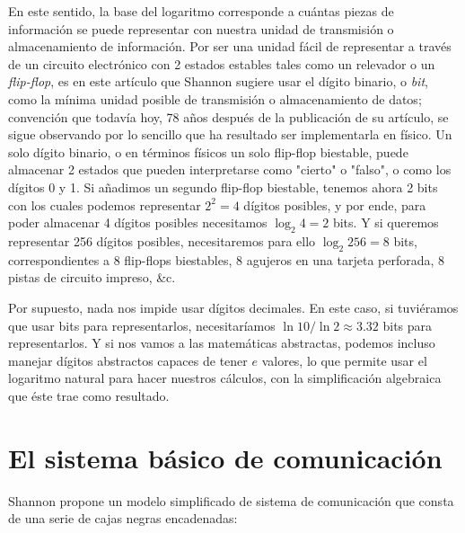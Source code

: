 \documentclass[spanish]{article}
\begin{document}
En este sentido, la base del logaritmo corresponde a cuántas piezas de información se puede representar con nuestra unidad de transmisión o almacenamiento de información. Por ser una unidad fácil de representar a través de un circuito electrónico con 2 estados estables tales como un relevador o un \textit{flip-flop}, es en este artículo que Shannon sugiere usar el dígito binario, o \textit{bit}, como la mínima unidad posible de transmisión o almacenamiento de datos; convención que todavía hoy, 78 años después de la publicación de su artículo, se sigue observando por lo sencillo que ha resultado ser implementarla en físico. Un solo dígito binario, o en términos físicos un solo flip-flop biestable, puede almacenar 2 estados que pueden interpretarse como "cierto" o "falso", o como los dígitos 0 y 1. Si añadimos un segundo flip-flop biestable, tenemos ahora 2 bits con los cuales podemos representar $2^2 = 4$ dígitos posibles, y por ende, para poder almacenar 4 dígitos posibles necesitamos $\log_2 4 = 2$ bits. Y si queremos representar 256 dígitos posibles, necesitaremos para ello $\log_2 256 = 8$ bits, correspondientes a 8 flip-flops biestables, 8 agujeros en una tarjeta perforada, 8 pistas de circuito impreso, \&c.

Por supuesto, nada nos impide usar dígitos decimales. En este caso, si tuviéramos que usar bits para representarlos, necesitaríamos $\ln 10 / \ln 2 \approx 3.32$ bits para representarlos. Y si nos vamos a las matemáticas abstractas, podemos incluso manejar dígitos abstractos capaces de tener $e$ valores, lo que permite usar el logaritmo natural para hacer nuestros cálculos, con la simplificación algebraica que éste trae como resultado.

\section{El sistema básico de comunicación}

Shannon propone un modelo simplificado de sistema de comunicación que consta de una serie de cajas negras encadenadas:
\end{document}
